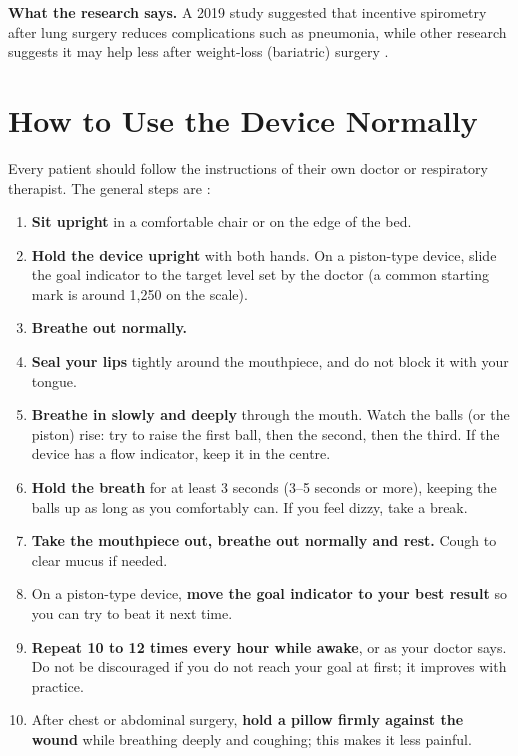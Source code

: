 \documentclass[12pt,a4paper]{article}
\begin{document}
\textbf{What the research says.} A 2019 study suggested that incentive spirometry after lung surgery reduces complications such as pneumonia, while other research suggests it may help less after weight-loss (bariatric) surgery \cite{verywell}.

\section{How to Use the Device Normally}
\label{sec:howto}

Every patient should follow the instructions of their own doctor or respiratory therapist. The general steps are \cite{cleveland, verywell}:
\begin{enumerate}
  \item \textbf{Sit upright} in a comfortable chair or on the edge of the bed.
  \item \textbf{Hold the device upright} with both hands. On a piston-type device, slide the goal indicator to the target level set by the doctor (a common starting mark is around 1,250 on the scale).
  \item \textbf{Breathe out normally.}
  \item \textbf{Seal your lips} tightly around the mouthpiece, and do not block it with your tongue.
  \item \textbf{Breathe in slowly and deeply} through the mouth. Watch the balls (or the piston) rise: try to raise the first ball, then the second, then the third. If the device has a flow indicator, keep it in the centre.
  \item \textbf{Hold the breath} for at least 3 seconds (3--5 seconds or more), keeping the balls up as long as you comfortably can. If you feel dizzy, take a break.
  \item \textbf{Take the mouthpiece out, breathe out normally and rest.} Cough to clear mucus if needed.
  \item On a piston-type device, \textbf{move the goal indicator to your best result} so you can try to beat it next time.
  \item \textbf{Repeat 10 to 12 times every hour while awake}, or as your doctor says. Do not be discouraged if you do not reach your goal at first; it improves with practice.
  \item After chest or abdominal surgery, \textbf{hold a pillow firmly against the wound} while breathing deeply and coughing; this makes it less painful.
\end{enumerate}
\end{document}
